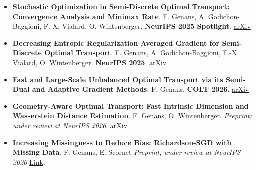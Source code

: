 \documentclass[a4paper,10pt]{article}
\begin{document}
\begin{itemize}[nosep,after=\strut, leftmargin=1em, itemsep=5pt,label=--]
    \item \textbf{Stochastic Optimization in Semi-Discrete Optimal Transport: Convergence Analysis and Minimax Rate}. F. Genans, A. Godichon-Baggioni, F.-X. Vialard, O. Wintenberger. \textbf{NeurIPS 2025 Spotlight}. \href{https://arxiv.org/pdf/2510.25287}{arXiv}

    \item \textbf{Decreasing Entropic Regularization Averaged Gradient for Semi-Discrete Optimal Transport}. F. Genans, A. Godichon-Baggioni, F.-X. Vialard, O. Wintenberger. \textbf{NeurIPS 2025}. \href{https://arxiv.org/abs/2510.27340}{arXiv}

    \item \textbf{Fast and Large-Scale Unbalanced Optimal Transport via its Semi-Dual and Adaptive Gradient Methods}. F. Genans. \textbf{COLT 2026}. \href{https://arxiv.org/pdf/2602.10697}{arXiv}

    \item \textbf{Geometry-Aware Optimal Transport: Fast Intrinsic Dimension and Wasserstein Distance Estimation}. F. Genans, O. Wintenberger. \textit{Preprint; under review at NeurIPS 2026}. \href{https://arxiv.org/pdf/2602.04335}{arXiv}

    \item \textbf{Increasing Missingness to Reduce Bias: Richardson-SGD with Missing Data}. F. Genans, E. Scornet \textit{Preprint;  under review at NeurIPS 2026} \href{https://ferdinand-genans.github.io/research/RichardsonMissingVals_Preprint.pdf}{Link}.
\end{itemize}


\end{document}

